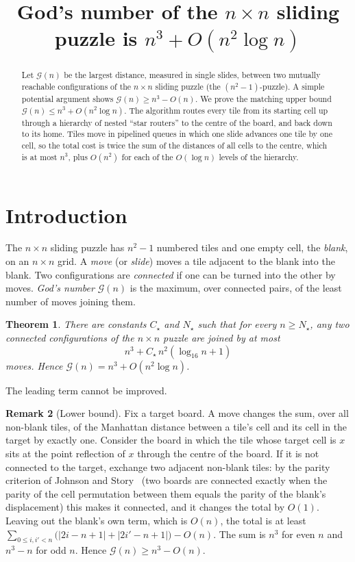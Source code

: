 \documentclass[11pt]{amsart}
\title[God's number of the sliding puzzle]{God's number of the $n\times n$ sliding puzzle is $n^3+O(n^2\log n)$}
\date{}
\newtheorem{theorem}{Theorem}[section]
\theoremstyle{definition}
\newtheorem{remark}[theorem]{Remark}
\begin{document}
\begin{abstract}
Let $\mathcal G(n)$ be the largest distance, measured in single slides, between two
mutually reachable configurations of the $n\times n$ sliding puzzle (the
$(n^2-1)$-puzzle). A simple potential argument shows $\mathcal G(n)\ge n^3-O(n)$. We
prove the matching upper bound $\mathcal G(n)\le n^3+O(n^2\log n)$. The algorithm routes every tile
from its starting cell up through a hierarchy of nested ``star routers'' to the
centre of the board, and back down to its home. Tiles move in pipelined queues in which one
slide advances one tile by one cell, so the total cost is
twice the sum of the distances of all cells to the centre, which is at most
$n^3$, plus $O(n^2)$ for each of the $O(\log n)$ levels of the hierarchy.
\end{abstract}

\maketitle

\section{Introduction}

The $n\times n$ sliding puzzle has $n^2-1$ numbered tiles and one empty cell, the
\emph{blank}, on an $n\times n$ grid. A \emph{move} (or \emph{slide}) moves a tile
adjacent to the blank into the blank. Two configurations are \emph{connected} if
one can be turned into the other by moves. \emph{God's number} $\mathcal G(n)$ is the
maximum, over connected pairs, of the least number of moves joining them.

\begin{theorem}\label{thm:main}
There are constants $C_\star$ and $N_\star$ such that for every $n\ge N_\star$, any two connected
configurations of the $n\times n$ puzzle are joined by at most
\[
n^3+C_\star\,n^2(\log_{16} n+1)
\]
moves. Hence $\mathcal G(n)=n^3+O(n^2\log n)$.
\end{theorem}

The leading term cannot be improved.

\begin{remark}[Lower bound]\label{rem:lower}
Fix a target board. A move changes the sum, over all non-blank tiles, of the Manhattan distance between a tile's
cell and its cell in the target by exactly one. Consider the board in which the tile whose target cell is $x$ sits at the point reflection of $x$
through the centre of the board. If it is not connected to the target, exchange two
adjacent non-blank tiles: by the parity criterion of Johnson and Story~\cite{johnsonstory} (two boards are connected exactly when
the parity of the cell permutation between them equals the parity of the blank's displacement) this makes it connected,
and it changes the total by $O(1)$. Leaving out the blank's own term, which is $O(n)$, the total is at least
$\sum_{0\le i,i'<n}\bigl(|2i-n+1|+|2i'-n+1|\bigr)-O(n)$. The sum is $n^3$ for even $n$ and
$n^3-n$ for odd $n$. Hence $\mathcal G(n)\ge n^3-O(n)$.
\end{remark}
\end{document}

